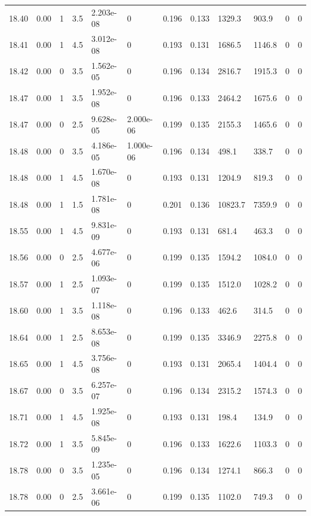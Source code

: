 \documentclass[preview]{standalone}
\begin{document}
{{{{{{{{{{{{{{{{{{{\begin{tabular}{L{1.2cm}C{1.2cm} C{0.3cm}C{0.5cm} C{1.4cm}C{1.4cm} C{1.4cm}C{1.4cm} C{1.6cm}C{1.6cm} C{1.6cm}C{1.6cm}}
  18.40  &  0.00  & 1     & 3.5 &  2.203e-08  & 0  &  0.196&   0.133& 1329.3 & 903.9   &  0 & 0  \\ 
  18.41  &  0.00  & 1     & 4.5 &  3.012e-08  & 0  &  0.193&   0.131& 1686.5 & 1146.8   &  0 & 0  \\ 
  18.42  &  0.00  & 0     & 3.5 &  1.562e-05  & 0  &  0.196&   0.134& 2816.7 & 1915.3   &  0 & 0  \\ 
  18.47  &  0.00  & 1     & 3.5 &  1.952e-08  & 0  &  0.196&   0.133& 2464.2 & 1675.6   &  0 & 0  \\ 
  18.47  &  0.00  & 0     & 2.5 &  9.628e-05  & 2.000e-06  &  0.199&   0.135& 2155.3 & 1465.6   &  0 & 0  \\ 
  18.48  &  0.00  & 0     & 3.5 &  4.186e-05  & 1.000e-06  &  0.196&   0.134& 498.1 & 338.7   &  0 & 0  \\ 
  18.48  &  0.00  & 1     & 4.5 &  1.670e-08  & 0  &  0.193&   0.131& 1204.9 & 819.3   &  0 & 0  \\ 
  18.48  &  0.00  & 1     & 1.5 &  1.781e-08  & 0  &  0.201&   0.136& 10823.7 & 7359.9   &  0 & 0  \\ 
  18.55  &  0.00  & 1     & 4.5 &  9.831e-09  & 0  &  0.193&   0.131& 681.4 & 463.3   &  0 & 0  \\ 
  18.56  &  0.00  & 0     & 2.5 &  4.677e-06  & 0  &  0.199&   0.135& 1594.2 & 1084.0   &  0 & 0  \\ 
  18.57  &  0.00  & 1     & 2.5 &  1.093e-07  & 0  &  0.199&   0.135& 1512.0 & 1028.2   &  0 & 0  \\ 
  18.60  &  0.00  & 1     & 3.5 &  1.118e-08  & 0  &  0.196&   0.133& 462.6 & 314.5   &  0 & 0  \\ 
  18.64  &  0.00  & 1     & 2.5 &  8.653e-08  & 0  &  0.199&   0.135& 3346.9 & 2275.8   &  0 & 0  \\ 
  18.65  &  0.00  & 1     & 4.5 &  3.756e-08  & 0  &  0.193&   0.131& 2065.4 & 1404.4   &  0 & 0  \\ 
  18.67  &  0.00  & 0     & 3.5 &  6.257e-07  & 0  &  0.196&   0.134& 2315.2 & 1574.3   &  0 & 0  \\ 
  18.71  &  0.00  & 1     & 4.5 &  1.925e-08  & 0  &  0.193&   0.131& 198.4 & 134.9   &  0 & 0  \\ 
  18.72  &  0.00  & 1     & 3.5 &  5.845e-09  & 0  &  0.196&   0.133& 1622.6 & 1103.3   &  0 & 0  \\ 
  18.78  &  0.00  & 0     & 3.5 &  1.235e-05  & 0  &  0.196&   0.134& 1274.1 & 866.3   &  0 & 0  \\ 
  18.78  &  0.00  & 0     & 2.5 &  3.661e-06  & 0  &  0.199&   0.135& 1102.0 & 749.3   &  0 & 0  \\ 

\end{tabular}}}}}}}}}}}}}}}}}}}}
\end{document}
